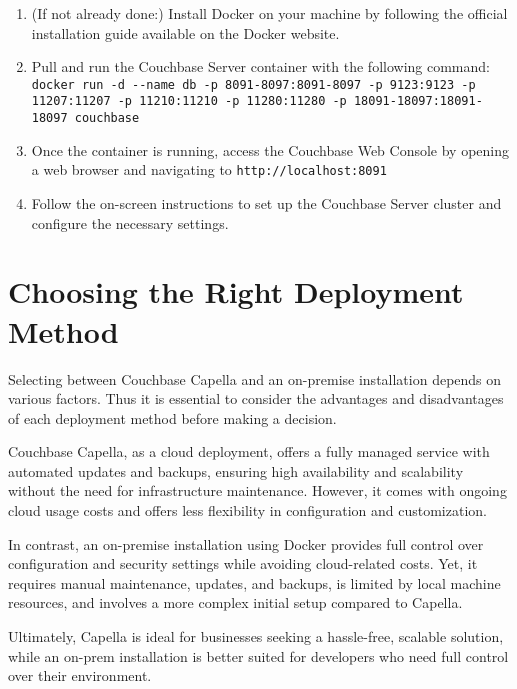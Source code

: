 \begin{enumerate}
  \item (If not already done:) Install Docker on your machine by following the official installation guide available on the Docker website.
  \item Pull and run the Couchbase Server container with the following command: \\
  \lstinline|docker run -d --name db -p 8091-8097:8091-8097 -p 9123:9123 -p 11207:11207 -p 11210:11210 -p 11280:11280 -p 18091-18097:18091-18097 couchbase| 
  \item Once the container is running, access the Couchbase Web Console by opening a web browser and navigating to \lstinline|http://localhost:8091|
  \item Follow the on-screen instructions to set up the Couchbase Server cluster and configure the necessary settings.
\end{enumerate}
\cite{couchbaseDocker}

\section{Choosing the Right Deployment Method}
Selecting between Couchbase Capella and an on-premise installation depends on various factors. Thus it is essential to consider the advantages and disadvantages of each deployment method before making a decision.

Couchbase Capella, as a cloud deployment, offers a fully managed service with automated updates and backups, ensuring high availability and scalability without the need for infrastructure maintenance. However, it comes with ongoing cloud usage costs and offers less flexibility in configuration and customization. 

In contrast, an on-premise installation using Docker provides full control over configuration and security settings while avoiding cloud-related costs. Yet, it requires manual maintenance, updates, and backups, is limited by local machine resources, and involves a more complex initial setup compared to Capella. 

Ultimately, Capella is ideal for businesses seeking a hassle-free, scalable solution, while an on-prem installation is better suited for developers who need full control over their environment.









